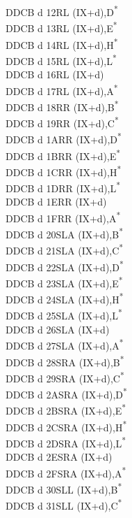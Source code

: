 \documentclass[oneside,a4paper]{book}
\begin{document}
\begin{multicols}{3}
{\begin{tabbing}
DDCB d 12\>RL (IX+d),D\textsuperscript{*}\\
DDCB d 13\>RL (IX+d),E\textsuperscript{*}\\
DDCB d 14\>RL (IX+d),H\textsuperscript{*}\\
DDCB d 15\>RL (IX+d),L\textsuperscript{*}\\
DDCB d 16\>RL (IX+d)\\
DDCB d 17\>RL (IX+d),A\textsuperscript{*}\\
DDCB d 18\>RR (IX+d),B\textsuperscript{*}\\
DDCB d 19\>RR (IX+d),C\textsuperscript{*}\\
DDCB d 1A\>RR (IX+d),D\textsuperscript{*}\\
DDCB d 1B\>RR (IX+d),E\textsuperscript{*}\\
DDCB d 1C\>RR (IX+d),H\textsuperscript{*}\\
DDCB d 1D\>RR (IX+d),L\textsuperscript{*}\\
DDCB d 1E\>RR (IX+d)\\
DDCB d 1F\>RR (IX+d),A\textsuperscript{*}\\
DDCB d 20\>SLA (IX+d),B\textsuperscript{*}\\
DDCB d 21\>SLA (IX+d),C\textsuperscript{*}\\
DDCB d 22\>SLA (IX+d),D\textsuperscript{*}\\
DDCB d 23\>SLA (IX+d),E\textsuperscript{*}\\
DDCB d 24\>SLA (IX+d),H\textsuperscript{*}\\
DDCB d 25\>SLA (IX+d),L\textsuperscript{*}\\
DDCB d 26\>SLA (IX+d)\\
DDCB d 27\>SLA (IX+d),A\textsuperscript{*}\\
DDCB d 28\>SRA (IX+d),B\textsuperscript{*}\\
DDCB d 29\>SRA (IX+d),C\textsuperscript{*}\\
DDCB d 2A\>SRA (IX+d),D\textsuperscript{*}\\
DDCB d 2B\>SRA (IX+d),E\textsuperscript{*}\\
DDCB d 2C\>SRA (IX+d),H\textsuperscript{*}\\
DDCB d 2D\>SRA (IX+d),L\textsuperscript{*}\\
DDCB d 2E\>SRA (IX+d)\\
DDCB d 2F\>SRA (IX+d),A\textsuperscript{*}\\
DDCB d 30\>SLL (IX+d),B\textsuperscript{*}\\
DDCB d 31\>SLL (IX+d),C\textsuperscript{*}\\

\end{tabbing}}
\end{multicols}
\end{document}

